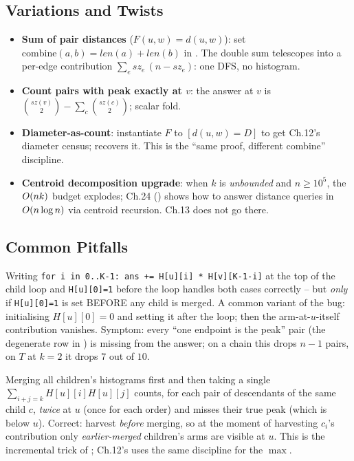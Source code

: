 \subsection{Variations and Twists}

\begin{itemize}[nosep]
  \item \textbf{Sum of pair distances} ($F(u,w)=d(u,w)$): set
        $\mathrm{combine}(a,b)=\mathit{len}(a)+\mathit{len}(b)$ in
        . The double sum telescopes into a per-edge
        contribution $\sum_{e} \mathit{sz}_e\,(n-\mathit{sz}_e)$: one DFS,
        no histogram. \hfill{}
  \item \textbf{Count pairs with peak exactly at $v$}: the answer at $v$
        is $\binom{\mathit{sz}(v)}{2}-\sum_c\binom{\mathit{sz}(c)}{2}$;
        scalar fold. \hfill{}
  \item \textbf{Diameter-as-count}: instantiate $F$ to
        $[d(u,w)=D]$ to get Ch.12's diameter census; 
        recovers it. This is the ``same proof, different combine''
        discipline. \hfill{}
  \item \textbf{Centroid decomposition upgrade}: when $k$ is
        \emph{unbounded} and $n\ge 10^{5}$, the $O(nk)$ budget
        explodes; Ch.24 () shows how to answer distance
        queries in $O(n\log n)$ via centroid recursion. Ch.13 does
        not go there. \hfill{}
\end{itemize}

\subsection{Common Pitfalls}

\begin{warningbox}
Writing \lstinline{for i in 0..K-1: ans += H[u][i] * H[v][K-1-i]} at the
top of the child loop and \lstinline{H[u][0]=1} before the loop handles
both cases correctly -- but \emph{only} if \lstinline{H[u][0]=1} is set
BEFORE any child is merged. A common variant of the bug: initialising
$\mathit{H}[u][0]=0$ and setting it after the loop; then the
arm-at-$u$-itself contribution vanishes. Symptom: every ``one endpoint
is the peak'' pair (the degenerate row in ) is missing
from the answer; on a chain this drops $n-1$ pairs, on $T$ at $k=2$ it
drops $7$ out of $10$.
\end{warningbox}

\begin{warningbox}
Merging all children's histograms first and then taking a single
$\sum_{i+j=k}\mathit{H}[u][i]\mathit{H}[u][j]$ counts, for each pair of
descendants of the same child $c$, \emph{twice} at $u$ (once for each
order) and misses their true peak (which is below $u$). Correct: harvest
\emph{before} merging, so at the moment of harvesting $c_i$'s contribution
only \emph{earlier-merged} children's arms are visible at $u$. This is the
incremental trick of ; Ch.12's  uses
the same discipline for the $\max$.
\end{warningbox}


